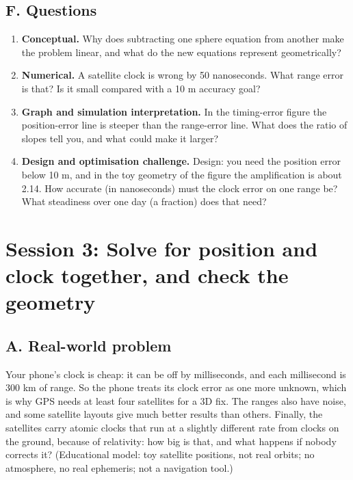 \documentclass[11pt,a4paper]{article}
\begin{document}
\subsection*{F. Questions}
\begin{enumerate}[nosep]
\item \textbf{Conceptual.} Why does subtracting one sphere equation from another make the problem linear, and what do the new equations represent geometrically?
\item \textbf{Numerical.} A satellite clock is wrong by 50 nanoseconds. What range error is that? Is it small compared with a 10 m accuracy goal?
\item \textbf{Graph and simulation interpretation.} In the timing-error figure the position-error line is steeper than the range-error line. What does the ratio of slopes tell you, and what could make it larger?
\item \textbf{Design and optimisation challenge.} Design: you need the position error below 10 m, and in the toy geometry of the figure the amplification is about 2.14. How accurate (in nanoseconds) must the clock error on one range be? What steadiness over one day (a fraction) does that need?
\end{enumerate}

\section{Session 3: Solve for position and clock together, and check the geometry}

\subsection*{A. Real-world problem}
Your phone's clock is cheap: it can be off by milliseconds, and each millisecond is 300 km of range. So the phone treats its clock error as one more unknown, which is why GPS needs at least four satellites for a 3D fix. The ranges also have noise, and some satellite layouts give much better results than others. Finally, the satellites carry atomic clocks that run at a slightly different rate from clocks on the ground, because of relativity: how big is that, and what happens if nobody corrects it? (Educational model: toy satellite positions, not real orbits; no atmosphere, no real ephemeris; not a navigation tool.)
\end{document}
